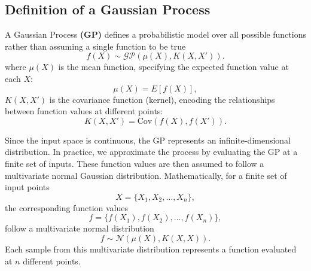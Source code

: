 \documentclass{ucdgradtaughtthesis}
\begin{document}
\subsection{Definition of a Gaussian Process}
\label{sec: Definition_of_GP}
%
A Gaussian Process \textbf{(GP)} defines a probabilistic model over all possible functions rather than assuming a single function to be true
\begin{equation}
f(X) \sim \mathcal{GP} (\mu(X), K(X, X')).
\label{eq: Initial_GP_distribution}
\end{equation}
where \( \mu(X) \) is the mean function, specifying the expected function value at each \( X \):
\begin{equation}
    \mu(X) = {E}[f(X)],
    \label{eq: meandef}
\end{equation}
%
\( K(X, X') \) is the covariance function (kernel), encoding the relationships between function values at different points:
\begin{equation}
    K(X, X') = \text{Cov}(f(X), f(X')).
    \label{eq: kerneldef}
\end{equation}
%

Since the input space is continuous, the GP represents an infinite-dimensional distribution. 
In practice, we approximate the process by evaluating the GP at a finite set of inputs.
These function values are then assumed to follow a multivariate normal Gaussian distribution.
%
Mathematically, for a finite set of input points
\begin{equation*}
X = \{X_1, X_2, \dots, X_n\},
\end{equation*}
 the corresponding function values
\begin{equation*}
f = \{f(X_1),f(X_2),...,f(X_n)\},
\end{equation*}
follow a multivariate normal distribution
\begin{equation}
f \sim \mathcal{N}\left(\mu(X), K(X, X)\right).
\label{eq: Multivariate_distribution}
\end{equation}
Each sample from this multivariate distribution represents a function evaluated at \( n \) different points.
\end{document}
